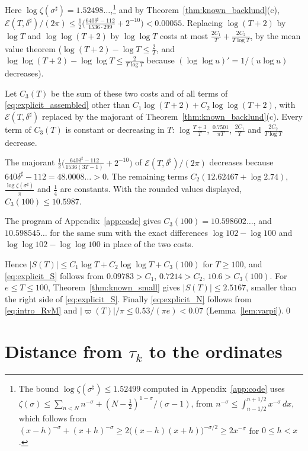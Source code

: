 \documentclass[11pt,a4paper]{article}
\makeatletter
\numberwithin{equation}{section}
\DeclareRobustCommand{\CGref}[1]{\ref{#1}}
\DeclareRobustCommand{\CGeqref}[1]{\eqref{#1}}
\let\CG@origref\ref
\let\CG@origeqref\eqref
\newcommand{\CG@gettip}[1]{\@ifundefined{CGTip@#1}{#1}{\csname CGTip@#1\endcsname}}
\DeclareRobustCommand{\CGref}[1]{\pdftooltip{\CG@origref{#1}}{\CG@gettip{#1}}}
\DeclareRobustCommand{\CGeqref}[1]{\pdftooltip{\CG@origeqref{#1}}{\CG@gettip{#1}}}
\theoremstyle{definition}
\theoremstyle{remark}
\makeatother
\begin{document}
Here $\log\zeta(\sigma^\sharp)=1.52498\ldots$,\footnote{The bound $\log\zeta(\sigma^\sharp)\le1.52499$ computed in Appendix~\CGref{app:code} uses $\zeta(\sigma)\le\sum_{n<N}n^{-\sigma}+(N-\frac12)^{1-\sigma}/(\sigma-1)$, from $n^{-\sigma}\le\int_{n-1/2}^{n+1/2}x^{-\sigma}\,dx$, which follows from $(x-h)^{-\sigma}+(x+h)^{-\sigma}\ge2\bigl((x-h)(x+h)\bigr)^{-\sigma/2}\ge2x^{-\sigma}$ for $0\le h<x$.} and by Theorem~\CGref{thm:known_backlund}(c), $\mathcal E(T,\delta^\sharp)/(2\pi)\le\frac12\bigl(\frac{640\delta^\sharp-112}{1536\cdot299}+2^{-10}\bigr)<0.00055$. Replacing $\log(T+2)$ by $\log T$ and $\log\log(T+2)$ by $\log\log T$ costs at most $\frac{2C_1}T+\frac{2C_2}{T\log T}$, by the mean value theorem ($\log(T+2)-\log T\le\frac2T$, and $\log\log(T+2)-\log\log T\le\frac2{T\log T}$ because $(\log\log u)'=1/(u\log u)$ decreases).

Let $C_3(T)$ be the sum of these two costs and of all terms of \CGeqref{eq:explicit_assembled} other than $C_1\log(T+2)+C_2\log\log(T+2)$, with $\mathcal E(T,\delta^\sharp)$ replaced by the majorant of Theorem~\CGref{thm:known_backlund}(c). Every term of $C_3(T)$ is constant or decreasing in $T$: $\log\frac{T+3}T$, $\frac{0.7501}{\pi T}$, $\frac{2C_1}T$ and $\frac{2C_2}{T\log T}$ decrease.

The majorant $\frac12\bigl(\frac{640\delta^\sharp-112}{1536(3T-1)}+2^{-10}\bigr)$ of $\mathcal E(T,\delta^\sharp)/(2\pi)$ decreases because $640\delta^\sharp-112=48.0008\ldots>0$. The remaining terms $C_2(12.62467+\log2.74)$, $\frac{\log\zeta(\sigma^\sharp)}\pi$ and $\frac14$ are constants. With the rounded values displayed, $C_3(100)\le10.5987$.

The program of Appendix~\CGref{app:code} gives $C_3(100)=10.598602\ldots$, and $10.598545\ldots$ for the same sum with the exact differences $\log102-\log100$ and $\log\log102-\log\log100$ in place of the two costs.

Hence $|S(T)|\le C_1\log T+C_2\log\log T+C_3(100)$ for $T\ge100$, and \CGeqref{eq:explicit_S} follows from $0.09783>C_1$, $0.7214>C_2$, $10.6>C_3(100)$. For $e\le T\le100$, Theorem~\CGref{thm:known_small} gives $|S(T)|\le2.5167$, smaller than the right side of \CGeqref{eq:explicit_S}. Finally \CGeqref{eq:explicit_N} follows from \CGeqref{eq:intro_RvM} and $|\varpi(T)|/\pi\le0.53/(\pi e)<0.07$ (Lemma~\CGref{lem:varpi}).\qed

\section{Distance from \texorpdfstring{$\tau_k$}{tau_k} to the ordinates}\label{sec:distance}
\end{document}
